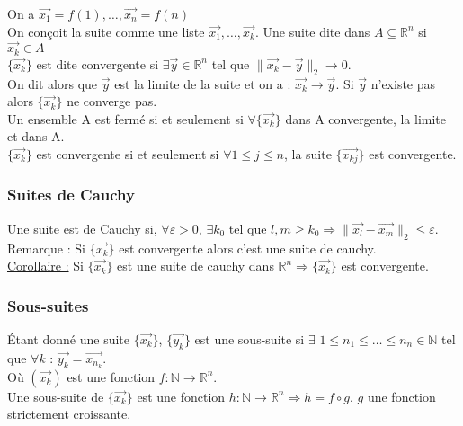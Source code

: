 \documentclass[../main.tex]{subfiles}
\begin{document}
On a $\vec{x_1} = f(1), \dots, \vec{x_n} = f(n)$\\
On conçoit la suite comme une liste $\vec{x_1}, \dots, \vec{x_k}$. Une suite dite dans $A \subseteq \mathbb{R}^n$ si $\vec{x_k} \in A$\\
$\{\vec{x_k}\}$ est dite convergente si $\exists \vec{y} \in \mathbb{R}^n$ tel que $\parallel \vec{x_k}-\vec{y}\parallel_2 \rightarrow 0$.\\
On dit alors que $\vec{y}$ est la limite de la suite et on a : $\vec{x_k} \rightarrow \vec{y}$. Si $\vec{y}$ n'existe pas alors $\{\vec{x_k}\}$ ne converge pas.\\

Un ensemble A est fermé si et seulement si $\forall \{\vec{x_k}\}$ dans A convergente, la limite et dans A.\\

$\{\vec{x_k}\}$ est convergente si et seulement si $\forall 1\leq j \leq n$, la suite $\{\vec{x_{kj}}\}$ est convergente.\\

\subsubsection{Suites de Cauchy}
Une suite est de Cauchy si, $\forall \varepsilon > 0$, $\exists k_0$ tel que $l,m \geq k_0 \Rightarrow \parallel \vec{x_l}-\vec{x_m} \parallel_2 \leq \varepsilon$.\\
\color{gray}Remarque : Si $\{\vec{x_k}\}$ est convergente alors c'est une suite de cauchy.\color{black}\\

\quad \underline{Corollaire :} Si $\{\vec{x_k}\}$ est une suite de cauchy dans $\mathbb{R}^n \Rightarrow \{\vec{x_k}\}$ est convergente.\\

\subsubsection{Sous-suites}
Étant donné une suite $\{\vec{x_k}\}$, $\{\vec{y_k}\}$ est une sous-suite si $\exists$ $1\leq n_1\leq \dots \leq n_n \in \mathbb{N}$ tel que $\forall k$ : $\vec{y_k} = \vec{x_{n_k}}$.\\
Où $(\vec{x_k})$ est une fonction $f:\mathbb{N} \rightarrow \mathbb{R}^n$. \\
Une sous-suite de $\{\vec{x_k}\}$ est une fonction $h:\mathbb{N} \rightarrow \mathbb{R}^n \Rightarrow h=f\circ g$, $g$ une fonction strictement croissante.\\
\end{document}
